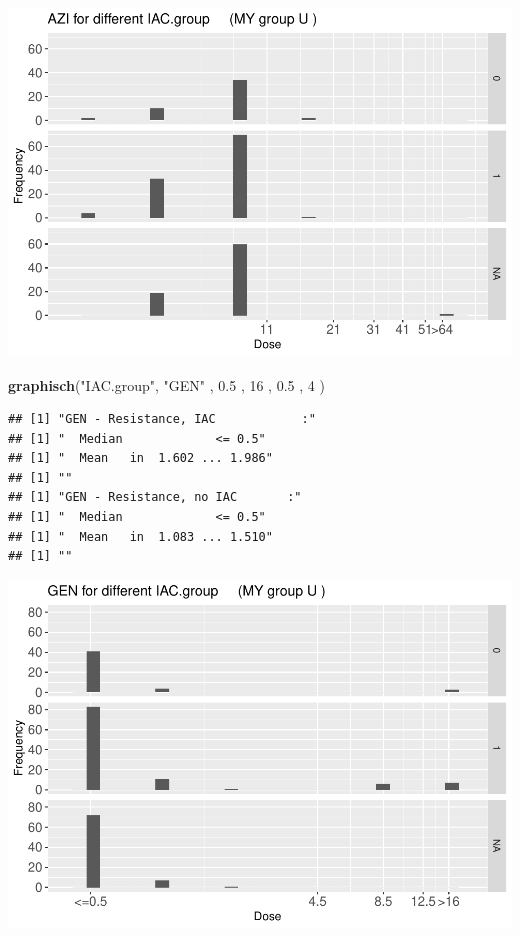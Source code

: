 \documentclass[
]{article}
\newenvironment{Shaded}{\begin{snugshade}}{\end{snugshade}}
\newcommand{\DecValTok}[1]{\textcolor[rgb]{0.00,0.00,0.81}{#1}}
\newcommand{\FloatTok}[1]{\textcolor[rgb]{0.00,0.00,0.81}{#1}}
\newcommand{\KeywordTok}[1]{\textcolor[rgb]{0.13,0.29,0.53}{\textbf{#1}}}
\newcommand{\NormalTok}[1]{#1}
\newcommand{\StringTok}[1]{\textcolor[rgb]{0.31,0.60,0.02}{#1}}
\begin{document}
\includegraphics{Verteilungen_files/figure-latex/unnamed-chunk-8-1.pdf}

\begin{Shaded}
\begin{Highlighting}[]
   \KeywordTok{graphisch}\NormalTok{(}\StringTok{"IAC.group"}\NormalTok{, }\StringTok{"GEN"}\NormalTok{ , }\FloatTok{0.5}\NormalTok{  ,  }\DecValTok{16}\NormalTok{   ,   }\FloatTok{0.5}\NormalTok{  ,   }\DecValTok{4}\NormalTok{    )}
\end{Highlighting}
\end{Shaded}

\begin{verbatim}
## [1] "GEN - Resistance, IAC            :"
## [1] "  Median             <= 0.5"
## [1] "  Mean   in  1.602 ... 1.986"
## [1] ""
## [1] "GEN - Resistance, no IAC       :"
## [1] "  Median             <= 0.5"
## [1] "  Mean   in  1.083 ... 1.510"
## [1] ""
\end{verbatim}

\includegraphics{Verteilungen_files/figure-latex/unnamed-chunk-9-1.pdf}
\end{document}
